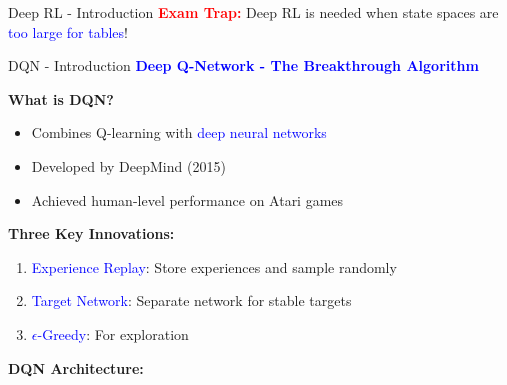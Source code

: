 \documentclass[8pt]{beamer}
\begin{document}
\begin{frame}{Deep RL - Introduction}
		\textcolor{red}{\textbf{Exam Trap:}} Deep RL is needed when state spaces are \textcolor{blue}{too large for tables}!
	\end{frame}
	



\begin{frame}{DQN - Introduction}
	\fontsize{6.5}{7.5}\selectfont
	\textcolor{blue}{\textbf{Deep Q-Network - The Breakthrough Algorithm}}
	
	\textbf{What is DQN?}
	\begin{itemize}
		\item Combines Q-learning with \textcolor{blue}{deep neural networks}
		\item Developed by DeepMind (2015)
		\item Achieved human-level performance on Atari games
	\end{itemize}
	
	\textbf{Three Key Innovations:}
	\begin{enumerate}
		\item \textcolor{blue}{Experience Replay}: Store experiences and sample randomly
		\item \textcolor{blue}{Target Network}: Separate network for stable targets
		\item \textcolor{blue}{$\epsilon$-Greedy}: For exploration
	\end{enumerate}
	

\textbf{DQN Architecture:}

\begin{center}
\end{center}
\end{frame}
\end{document}

